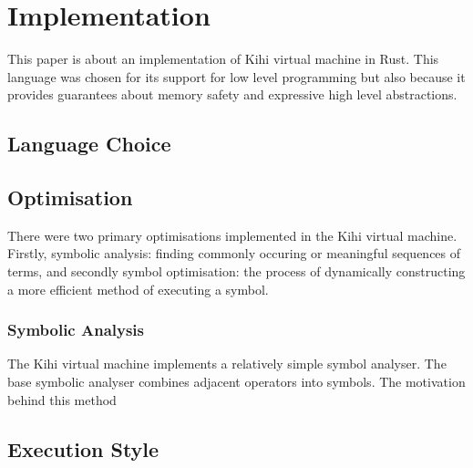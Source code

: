 \chapter{Implementation} \label{C:implementation} 

This paper is about an implementation of Kihi virtual machine
in Rust. This language was chosen for its support for low
level programming but also because it provides guarantees about
memory safety and expressive high level abstractions.

\section{Language Choice}

\section{Optimisation}
There were two primary optimisations implemented in the Kihi virtual
machine. Firstly, symbolic analysis: finding commonly occuring or
meaningful sequences of terms, and secondly symbol optimisation: the
process of dynamically constructing a more efficient method of executing
a symbol. 

\subsection{Symbolic Analysis}
The Kihi virtual machine implements a relatively simple symbol analyser.
The base symbolic analyser combines adjacent operators into symbols. The
motivation behind this method

\section{Execution Style}




